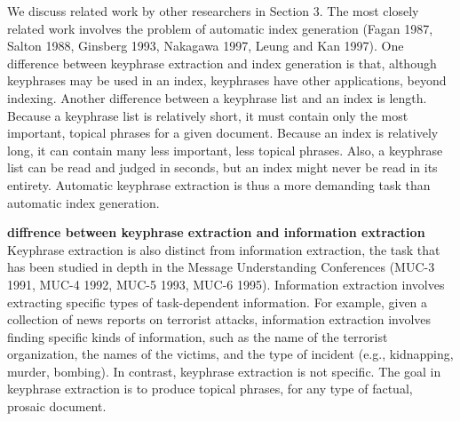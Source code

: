 We discuss related work by other researchers in Section 3. The most closely related work involves the problem of automatic index generation (Fagan 1987, Salton 1988, Ginsberg 1993, Nakagawa 1997, Leung and Kan 1997). One difference between keyphrase extraction and index generation is that, although keyphrases may be used in an index, keyphrases have other applications, beyond indexing. Another difference between a keyphrase list and an index is length. Because a keyphrase list is relatively short, it must contain only the most important, topical phrases for a given document. Because an index is relatively long, it can contain many less important, less topical phrases. Also, a keyphrase list can be read and judged in seconds, but an index might never be read in its entirety. Automatic keyphrase extraction is thus a more demanding task than automatic index generation. \cite{turney2000}

\textbf{diffrence between keyphrase extraction and information extraction}
Keyphrase extraction is also distinct from information extraction, the task that has been studied in depth in the Message Understanding Conferences (MUC-3 1991, MUC-4 1992, MUC-5 1993, MUC-6 1995). Information extraction involves extracting specific types of task-dependent information. For example, given a collection of news reports on terrorist attacks, information extraction involves finding specific kinds of information, such as the name of the terrorist organization, the names of the victims, and the type of incident (e.g., kidnapping, murder, bombing). In contrast, keyphrase extraction is not specific. The goal in keyphrase extraction is to produce topical phrases, for any type of factual, prosaic document. \cite{turney2000}


